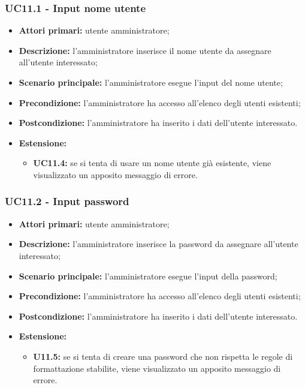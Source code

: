 \subsubsection{UC11.1 - Input nome utente}
	\begin{itemize}
		\item \textbf{Attori primari:} utente amministratore;
		\item \textbf{Descrizione:} l'amministratore inserisce il nome utente da assegnare all'utente interessato;
		\item \textbf{Scenario principale:} l'amministratore esegue l'input del nome utente;
		\item \textbf{Precondizione:} l'amministratore ha accesso all'elenco degli utenti esistenti;
		\item \textbf{Postcondizione:} l'amministratore ha inserito i dati dell'utente interessato.
		\item \textbf{Estensione:}
		\begin{itemize}
			\item \textbf{UC11.4:} se si tenta di usare un nome utente già esistente, viene visualizzato un apposito messaggio di errore.
		\end{itemize}
	\end{itemize}

\subsubsection{UC11.2 - Input password}
	\begin{itemize}
		\item \textbf{Attori primari:} utente amministratore;
		\item \textbf{Descrizione:} l'amministratore inserisce la password da assegnare all'utente interessato;
		\item \textbf{Scenario principale:} l'amministratore esegue l'input della password;
		\item \textbf{Precondizione:} l'amministratore ha accesso all'elenco degli utenti esistenti;
		\item \textbf{Postcondizione:} l'amministratore ha inserito i dati dell'utente interessato.
		\item \textbf{Estensione:}
		\begin{itemize}
			\item \textbf{U11.5:} se si tenta di creare una password che non rispetta le regole di formattazione stabilite, viene visualizzato un apposito messaggio di errore.
		\end{itemize}
	\end{itemize}

